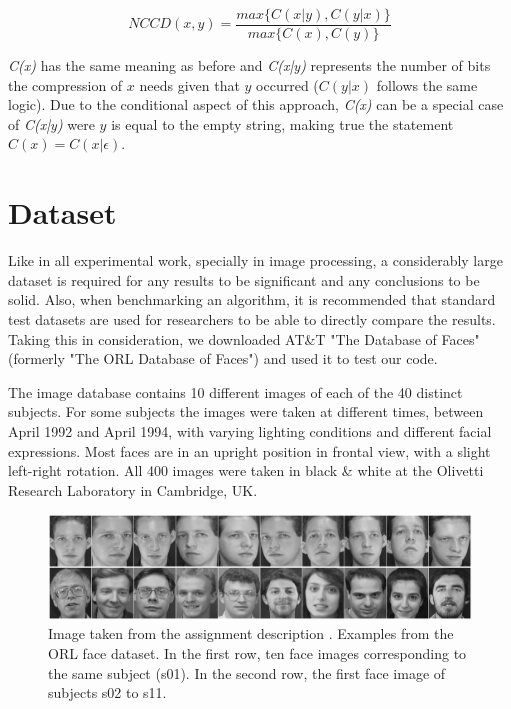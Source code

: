 \documentclass[12pt]{article}
\begin{document}
\begin{equation}\label{eq:3}
  NCCD(x,y) = \frac{max\{C(x|y), C(y|x)\}}{max\{C(x), C(y)\}}
\end{equation}

\textit{C(x)} has the same meaning as before and \textit{C(x|y)} represents the number of bits the compression of $x$ needs given that $y$ occurred 
($C(y|x)$ follows the same logic). 
Due to the conditional aspect of this approach, \textit{C(x)} can be a special case of \textit{C(x|y)} were $y$ is equal to the empty string, making true the
statement $C(x) = C(x|\epsilon)$.

\newpage
\section{Dataset} %

Like in all experimental work, specially in image processing, a considerably large dataset is required for any results to be significant and any conclusions to be solid.
Also, when benchmarking an algorithm, it is recommended that standard test datasets are used for researchers to be able to directly compare the results. 
Taking this in consideration, we downloaded AT\&T "The Database of Faces" (formerly "The ORL Database of Faces") and used it to test our code.

The image database contains 10 different images of each of the 40 distinct subjects.
For some subjects the images were taken at different times, between April 1992 and April 1994, with varying lighting conditions and different facial expressions.
Most faces are in an upright position in frontal view, with a slight left-right rotation.
All 400 images were taken in black \& white at the Olivetti Research Laboratory in Cambridge, UK.

\begin{figure}[H]
  \centering
  \begin{minipage}{\textwidth}
    \centering
    \includegraphics[width=\linewidth]{faces_example.png}
  \end{minipage}%
  \caption{Image taken from the assignment description \cite{trab3}. Examples from the ORL face dataset. In the first row, ten face images corresponding to the same subject (s01). In the second row, the first face image of subjects s02 to s11.}
  \label{fig:1}
\end{figure}
\end{document}
